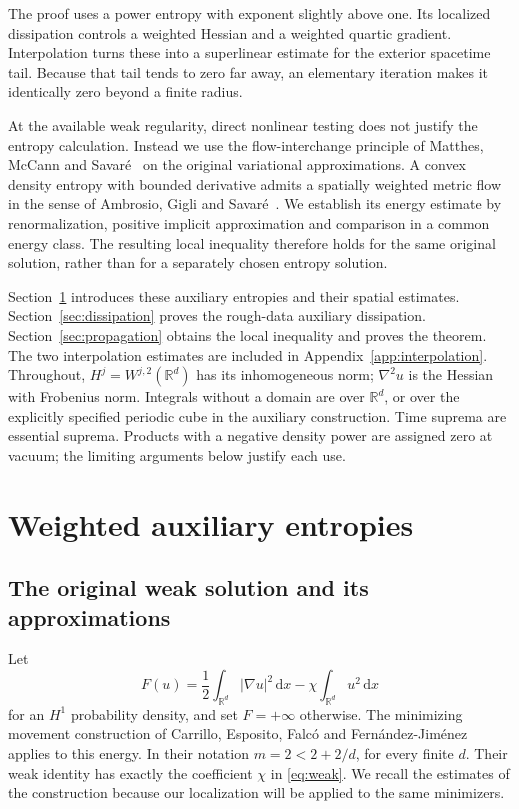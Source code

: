 \documentclass[11pt]{article}
\numberwithin{equation}{section}
\theoremstyle{definition}
\theoremstyle{remark}
\newcommand{\R}{\mathbb R}
\newcommand{\dd}{\,\mathrm d}
\begin{document}
The proof uses a power entropy with exponent slightly above one. Its
localized dissipation controls a weighted Hessian and a weighted quartic
gradient. Interpolation turns these into a superlinear estimate for the
exterior spacetime tail. Because that tail tends to zero far away, an
elementary iteration makes it identically zero beyond a finite radius.

At the available weak regularity, direct nonlinear testing does not justify
the entropy calculation. Instead we use the flow-interchange principle
of Matthes, McCann and Savar\'e~\cite{MMS} on the original variational
approximations. A convex density entropy with bounded derivative admits
a spatially weighted metric flow in the sense of Ambrosio, Gigli and
Savar\'e~\cite{AGS}. We establish its energy estimate by renormalization,
positive implicit approximation and comparison in a common energy class.
The resulting local inequality therefore holds for the same original
solution, rather than for a separately chosen entropy solution.

Section~\ref{sec:entropies} introduces these auxiliary entropies and their
spatial estimates. Section~\ref{sec:dissipation} proves the rough-data
auxiliary dissipation. Section~\ref{sec:propagation} obtains the local
inequality and proves the theorem. The two interpolation estimates are
included in Appendix~\ref{app:interpolation}.
Throughout, $H^j=W^{j,2}(\R^d)$ has its inhomogeneous norm;
$\nabla^2u$ is the Hessian with Frobenius norm. Integrals without a domain
are over $\R^d$, or over the explicitly specified periodic cube in the
auxiliary construction. Time suprema are essential suprema. Products
with a negative density power are assigned zero at vacuum; the limiting
arguments below justify each use.

\section{Weighted auxiliary entropies}\label{sec:entropies}

\subsection{The original weak solution and its approximations}
Let
\begin{equation}\label{eq:F}
 F(u)=\frac12\int_{\R^d}|\nabla u|^2\dd x
             -\chi\int_{\R^d}u^2\dd x
\end{equation}
for an $H^1$ probability density, and set $F=+\infty$ otherwise.
The minimizing movement construction of Carrillo, Esposito, Falc\'o and
Fern\'andez-Jim\'enez~\cite[Definition~2.1, Theorem~2.2 and Section~4]{CEFF}
applies to this energy. In their notation $m=2<2+2/d$, for every finite $d$.
Their weak identity has exactly the coefficient $\chi$ in
\eqref{eq:weak}. We recall the estimates of the construction because our
localization will be applied to the same minimizers.
\end{document}
